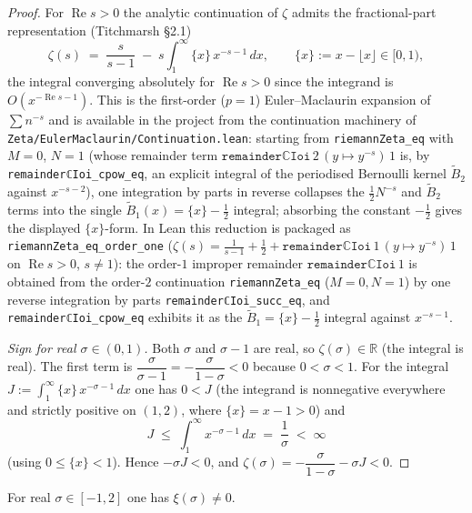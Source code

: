 \begin{proof}
\leanok
{}
For $\operatorname{Re} s>0$ the analytic continuation of $\zeta$ admits the
fractional-part representation (Titchmarsh \S2.1)
\[
  \zeta(s) \;=\; \frac{s}{s-1} \;-\; s\int_1^\infty \{x\}\,x^{-s-1}\,dx ,
  \qquad \{x\}:=x-\lfloor x\rfloor\in[0,1) ,
\]
the integral converging absolutely for $\operatorname{Re} s>0$ since the integrand is
$O\!\left(x^{-\operatorname{Re} s-1}\right)$. This is the first-order ($p=1$)
Euler--Maclaurin expansion of $\sum n^{-s}$ and is available in the project from the
continuation machinery of \texttt{Zeta/EulerMaclaurin/Continuation.lean}: starting from
\texttt{riemannZeta\_eq} with $M=0$, $N=1$ (whose remainder term
$\texttt{remainderℂIoi}\,2\,(y\mapsto y^{-s})\,1$ is, by
\texttt{remainderℂIoi\_cpow\_eq}, an explicit integral of the periodised Bernoulli
kernel $\widetilde B_2$ against $x^{-s-2}$), one integration by parts in reverse
collapses the $\tfrac12 N^{-s}$ and $\widetilde B_2$ terms into the single
$\widetilde B_1(x)=\{x\}-\tfrac12$ integral; absorbing the constant
$-\tfrac12$ gives the displayed $\{x\}$-form. In Lean this reduction is packaged as
\texttt{riemannZeta\_eq\_order\_one}
($\zeta(s)=\tfrac1{s-1}+\tfrac12+\texttt{remainderℂIoi}\,1\,(y\mapsto y^{-s})\,1$ on
$\operatorname{Re} s>0$, $s\neq1$): the order-$1$ improper remainder
$\texttt{remainderℂIoi}\,1$ is obtained from the order-$2$ continuation
\texttt{riemannZeta\_eq} ($M=0,N=1$) by one reverse integration by parts
\texttt{remainderℂIoi\_succ\_eq}, and \texttt{remainderℂIoi\_cpow\_eq} exhibits it as the
$\widetilde B_1=\{x\}-\tfrac12$ integral against $x^{-s-1}$.

\emph{Sign for real $\sigma\in(0,1)$.} Both $\sigma$ and $\sigma-1$ are real, so
$\zeta(\sigma)\in\mathbb{R}$ (the integral is real). The first term is
$\dfrac{\sigma}{\sigma-1}=-\dfrac{\sigma}{1-\sigma}<0$ because $0<\sigma<1$. For the
integral $J:=\int_1^\infty\{x\}\,x^{-\sigma-1}\,dx$ one has $0<J$ (the integrand is
nonnegative everywhere and strictly positive on $(1,2)$, where $\{x\}=x-1>0$) and
\[
  J\;\le\;\int_1^\infty x^{-\sigma-1}\,dx\;=\;\frac1\sigma\;<\;\infty
\]
(using $0\le\{x\}<1$). Hence $-\sigma J<0$, and
$\zeta(\sigma)=-\dfrac{\sigma}{1-\sigma}-\sigma J<0$.
\end{proof}

\begin{lemma}
\label{lem:nf_xi_ne_zero_real}
\leanok
{}
For real $\sigma\in[-1,2]$ one has $\xi(\sigma)\neq0$.
\end{lemma}

